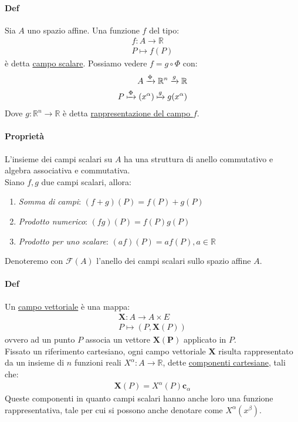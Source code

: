 \documentclass[10pt,a4paper]{book}
\begin{document}
    \paragraph{Def} Sia $A$ uno spazio affine. Una funzione $f$ del tipo:
    \begin{align*}
        f:A\to \mathbb{R}\\
        P\mapsto f(P)
    \end{align*}
    è detta \underline{campo scalare}.
    Possiamo vedere $f=g\circ \Phi$ con:
    \begin{align*}
    A\xrightarrow[]{\Phi} \mathbb{R}^n\xrightarrow[]{g} \mathbb{R}\\P\xmapsto[]{\Phi}(x^\alpha)\xmapsto[]{g} g(x^\alpha)
    \end{align*}
    Dove $g\colon\mathbb{R}^n\to \mathbb{R}$ è detta \underline{rappresentazione del campo $f$}.
    \paragraph*{Proprietà} L'insieme dei campi scalari su $A$ ha una struttura di anello commutativo e algebra associativa e commutativa.\\
     Siano $f,g$ due campi scalari, allora:
    \begin{enumerate}
        \item \textit{Somma di campi}: $(f+g)(P)=f(P)+g(P)$
        \item \textit{Prodotto numerico}: $(fg)(P)=f(P)g(P)$
        \item \textit{Prodotto per uno scalare}: $(af)(P)=af(P), a \in \mathbb{R}$
    \end{enumerate}
    Denoteremo con $\mathcal{F}(A)$ l'anello dei campi scalari sullo spazio affine $A$.
    \paragraph*{Def} Un \underline{campo vettoriale} è una mappa:
    \begin{align*}
        \mathbf{X}\colon A \to A\times E\\
        P\mapsto (P,\mathbf{X}(P))
    \end{align*}
    ovvero ad un punto $P$ associa un vettore $\mathbf{X(P)}$ applicato in $P$.\\
    Fissato un riferimento cartesiano, ogni campo vettoriale $\mathbf{X}$ risulta rappresentato da un insieme di $n$ funzioni reali $X^\alpha\colon A \to \mathbb{R}$, dette \underline{componenti cartesiane}, tali che:
    \begin{align*}
        \mathbf{X}(P)=X^\alpha(P)\mathbf{c}_\alpha
    \end{align*}
    Queste componenti in quanto campi scalari hanno anche loro una funzione rappresentativa, tale per cui si possono anche denotare come $X^\alpha(x^{\beta})$.
\end{document}
